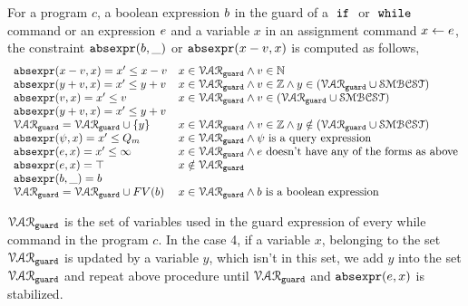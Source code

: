 \begin{defn}
  \label{def:constraint_compute}
  For a program $c$, a boolean expression $b$ in the guard of a $\;\mathtt{if}\;$ or $\;\mathtt{while}\;$ command
  or an expression $e$ and a variable $x$
  in an assignment command $\mathrel{ x \leftarrow e }$,
  the constraint $\mathtt{abs}{\mathtt{expr}}(b, \_)$ or $\mathtt{abs}{\mathtt{expr}}(x - v, x)$ is computed as follows,
  \[
    \begin{array}{ll} 
      \mathtt{abs}{\mathtt{expr}}(x - v, x)  = x' \leq x - v  & x \in \mathcal{VAR}_{\mathtt{guard}} \land v \in \mathbb{N} \\
      \mathtt{abs}{\mathtt{expr}}(y + v, x)  = x' \leq y + v  & x \in \mathcal{VAR}_{\mathtt{guard}} \land v \in \mathbb{Z} \land y \in (\mathcal{VAR}_{\mathtt{guard}} \cup \mathcal{SMBCST}) \\
      \mathtt{abs}{\mathtt{expr}}(v, x)  = x' \leq v  & x \in \mathcal{VAR}_{\mathtt{guard}} \land v \in (\mathcal{VAR}_{\mathtt{guard}} \cup \mathcal{SMBCST}) \\
      \mathtt{abs}{\mathtt{expr}}(y + v, x)  = x' \leq y + v & \\
      \mathcal{VAR}_{\mathtt{guard}} = \mathcal{VAR}_{\mathtt{guard}} \cup \{y\} & x \in \mathcal{VAR}_{\mathtt{guard}} \land v \in \mathbb{Z} \land y \notin (\mathcal{VAR}_{\mathtt{guard}} \cup \mathcal{SMBCST})  \\
      \mathtt{abs}{\mathtt{expr}}(\psi, x)  = x' \leq Q_m & x \in \mathcal{VAR}_{\mathtt{guard}} \land \psi \text{ is a query expression}  \\
      \mathtt{abs}{\mathtt{expr}}(e, x) = x' \leq \infty  &  x \in \mathcal{VAR}_{\mathtt{guard}} \land e \text{ doesn't have any of the forms as above} \\
      \mathtt{abs}{\mathtt{expr}}(e, x) = \top  &  x \notin \mathcal{VAR}_{\mathtt{guard}} \\
      \mathtt{abs}{\mathtt{expr}}(b, \_) = b   & \\
      \mathcal{VAR}_{\mathtt{guard}} = \mathcal{VAR}_{\mathtt{guard}} \cup FV(b) &  x \in \mathcal{VAR}_{\mathtt{guard}} \land b \text{ is a boolean expression} \\
    \end{array}
    \]
  \end{defn}
%
  $\mathcal{VAR}_{\mathtt{guard}}$ is the set of variables used in the guard expression of every while command in the program $c$. 
  In the case 4, if a variable $x$, belonging to the set 
  $\mathcal{VAR}_{\mathtt{guard}}$ is updated by a variable $y$, which isn't in this set, 
  we add $y$ into the set $\mathcal{VAR}_{\mathtt{guard}}$ and repeat 
  above procedure  until $\mathcal{VAR}_{\mathtt{guard}}$ and $\mathtt{abs}{\mathtt{expr}}(e, x)$ is stabilized. 
